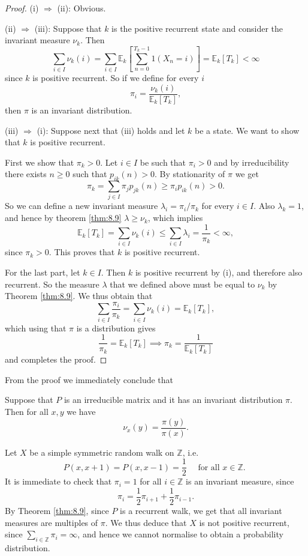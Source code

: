 \documentclass[a4paper]{article}
\begin{document}
\begin{proof}
    (i) $ \Rightarrow$ (ii): Obvious. 

    (ii) $ \Rightarrow $ (iii): Suppose that $k$ is the positive recurrent state and consider the invariant measure $\nu_k$. Then
    \[
    \sum_{i \in I} \nu_k(i)=\sum_{i \in I} \mathbb{E}_k\left[\sum_{n=0}^{T_k-1} 1\left(X_n=i\right)\right]=\mathbb{E}_k\left[T_k\right]<\infty
    \]
    since $k$ is positive recurrent. So if we define for every $i$
    \[
    \pi_i=\frac{\nu_k(i)}{\mathbb{E}_k\left[T_k\right]},
    \]
    then $\pi$ is an invariant distribution.

    (iii) $ \Rightarrow $ (i): Suppose next that (iii) holds and let $k$ be a state. We want to show that $k$ is positive recurrent. 
    
    First we show that $\pi_k>0$. Let $i \in I$ be such that $\pi_i>0$ and by irreducibility there exists $n \geq 0$ such that $p_{i k}(n)>0$. By stationarity of $\pi$ we get
    \[
    \pi_k=\sum_{j \in I} \pi_j p_{j k}(n) \geq \pi_i p_{i k}(n)>0 .
    \]
    So we can define a new invariant measure $\lambda_i=\pi_i / \pi_k$ for every $i \in I$. Also $\lambda_k=1$, and hence by theorem \ref{thm:8.9} $\lambda \geq \nu_k$, which implies
    \[
    \mathbb{E}_k\left[T_k\right]=\sum_{i \in I} \nu_k(i) \leq \sum_{i \in I} \lambda_i=\frac{1}{\pi_k}<\infty,
    \]
    since $\pi_k>0$. This proves that $k$ is positive recurrent.

    For the last part, let $k \in I$. Then $k$ is positive recurrent by (i), and therefore also recurrent. So the measure $\lambda$ that we defined above must be equal to $\nu_k$ by Theorem \ref{thm:8.9}. We thus obtain that
    \[
    \sum_{i \in I} \frac{\pi_i}{\pi_k}=\sum_{i \in I} \nu_k(i)=\mathbb{E}_k\left[T_k\right],
    \]
    which using that $\pi$ is a distribution gives
    \[
    \frac{1}{\pi_k}=\mathbb{E}_k\left[T_k\right] \implies \pi_k = \frac{1}{\mathbb{E}_k[T_k]}
    \]
    and completes the proof.
\end{proof}

From the proof we immediately conclude that

\begin{corollary}\label{col:8.12}
    Suppose that $P$ is an irreducible matrix and it has an invariant distribution $\pi$. Then for all $x, y$ we have
    \[
    \nu_x(y)=\frac{\pi(y)}{\pi(x)} .
    \]
\end{corollary}

\begin{example}
    Let $X$ be a simple symmetric random walk on $\mathbb{Z}$, i.e.
    \[
    P(x, x+1)=P(x, x-1)=\frac{1}{2} \quad \text { for all } x \in \mathbb{Z} \text {. }
    \]
    It is immediate to check that $\pi_i=1$ for all $i \in \mathbb{Z}$ is an invariant measure, since
    \[
    \pi_i=\frac{1}{2} \pi_{i+1}+\frac{1}{2} \pi_{i-1} .
    \]
    By Theorem \ref{thm:8.9}, since $P$ is a recurrent walk, we get that all invariant measures are multiples of $\pi$. We thus deduce that $X$ is not positive recurrent, since $\sum_{i \in \mathbb{Z}} \pi_i=\infty$, and hence we cannot normalise to obtain a probability distribution.
\end{example}
\end{document}
